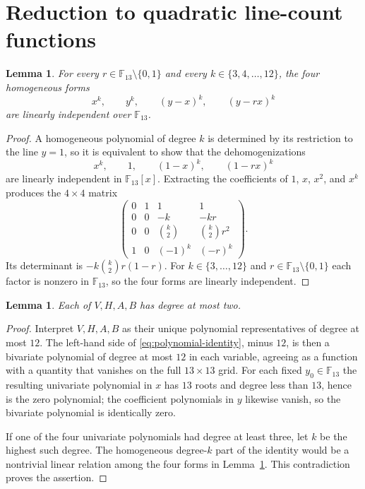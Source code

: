 \documentclass[10pt,a4paper]{amsart}
\newtheorem{lemma}[theorem]{Lemma}
\newcommand{\F}{\mathbb F}
\begin{document}
\section{Reduction to quadratic line-count functions}\label{sec:degree}

\begin{lemma}\label{lem:rank}
For every $r\in\F_{13}\setminus\{0,1\}$ and every
$k\in\{3,4,\ldots,12\}$, the four homogeneous forms
\[
  x^k,\qquad y^k,\qquad (y-x)^k,\qquad (y-rx)^k
\]
are linearly independent over $\F_{13}$.
\end{lemma}

\begin{proof}
A homogeneous polynomial of degree $k$ is determined by its restriction to
the line $y=1$, so it is equivalent to show that the dehomogenizations
\[
  x^k,\qquad 1,\qquad (1-x)^k,\qquad (1-rx)^k
\]
are linearly independent in $\F_{13}[x]$.  Extracting the coefficients of
$1$, $x$, $x^{2}$, and $x^{k}$ produces the $4\times4$ matrix
\[
\begin{pmatrix}
0 & 1 & 1 & 1 \\
0 & 0 & -k & -kr \\
0 & 0 & \binom{k}{2} & \binom{k}{2}r^{2} \\
1 & 0 & (-1)^{k} & (-r)^{k}
\end{pmatrix}.
\]
Its determinant is $-k\binom{k}{2}r(1-r)$.  For
$k\in\{3,\ldots,12\}$ and $r\in\F_{13}\setminus\{0,1\}$ each factor is
nonzero in $\F_{13}$, so the four forms are linearly independent.
\end{proof}

\begin{lemma}\label{lem:degree-two}
Each of $V,H,A,B$ has degree at most two.
\end{lemma}

\begin{proof}
Interpret $V,H,A,B$ as their unique polynomial representatives of degree at
most $12$.  The left-hand side of \eqref{eq:polynomial-identity}, minus
$12$, is then a bivariate polynomial of degree at most $12$ in each
variable, agreeing as a function with a quantity that vanishes on the full
$13\times13$ grid.  For each fixed $y_{0}\in\F_{13}$ the resulting univariate
polynomial in $x$ has $13$ roots and degree less than $13$, hence is the
zero polynomial; the coefficient polynomials in $y$ likewise vanish, so the
bivariate polynomial is identically zero.

If one of the four univariate polynomials had degree at least three, let $k$
be the highest such degree.  The homogeneous degree-$k$ part of the identity
would be a nontrivial linear relation among the four forms in
Lemma~\ref{lem:rank}.  This contradiction proves the assertion.
\end{proof}
\end{document}
